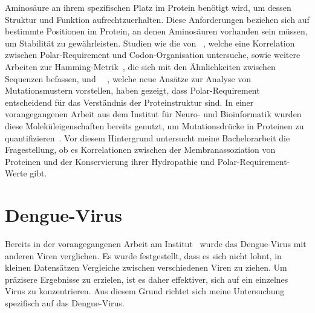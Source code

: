 \documentclass[german,version-2022-01]{uzl-thesis}
\begin{document}
Aminos\"aure an ihrem spezifischen Platz im Protein ben\"otigt wird, um dessen Struktur und Funktion aufrechtzuerhalten. Diese Anforderungen beziehen sich auf bestimmte Positionen im Protein, an denen Aminos\"auren vorhanden sein m\"ussen, um Stabilit\"at zu gew\"ahrleisten. Studien wie die von \citeauthor{mathew_physical_2008}~\cite{mathew_physical_2008}, welche eine Korrelation zwischen Polar-Requirement und Codon-Organisation untersuche, sowie weitere Arbeiten zur Hamming-Metrik~\cite{hammingMetric}, die sich mit den \"Ahnlichkeiten zwischen Sequenzen befassen, und \citeauthor{lenstra2015}~\citeyear{lenstra2015}~\cite{lenstra2015}, welche neue Ans\"atze zur Analyse von Mutationsmustern vorstellen, haben gezeigt, dass Polar-Requirement entscheidend f\"ur das Verst\"andnis der Proteinstruktur sind. In einer vorangegangenen Arbeit aus dem Institut f\"ur Neuro- und Bioinformatik wurden diese Molek\"uleigenschaften bereits genutzt, um Mutationsdr\"ucke in Proteinen zu quantifizieren~\cite{nina}. Vor diesem Hintergrund untersucht meine Bachelorarbeit die Fragestellung, ob es Korrelationen zwischen der Membranassoziation von Proteinen und der Konservierung ihrer Hydropathie und Polar-Requirement-Werte gibt.

\section{Dengue-Virus}
Bereits in der vorangegangenen Arbeit am Institut~\cite{nina} wurde das Dengue-Virus mit anderen Viren verglichen. Es wurde festgestellt, dass es sich nicht lohnt, in kleinen Datens\"atzen Vergleiche zwischen verschiedenen Viren zu ziehen. Um pr\"azisere Ergebnisse zu erzielen, ist es daher effektiver, sich auf ein einzelnes Virus zu konzentrieren. Aus diesem Grund richtet sich meine Untersuchung spezifisch auf das Dengue-Virus.
\end{document}
